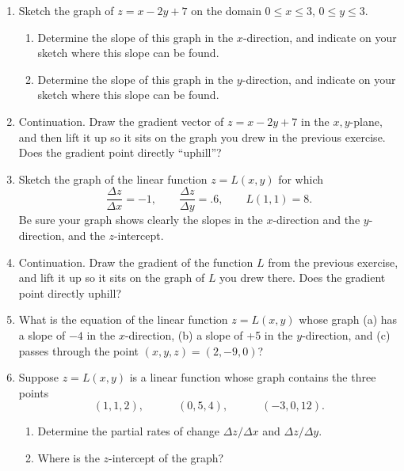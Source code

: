 \begin{enumerate}
\begin{enumerate}
  \item Write the formula for $z$ in intercept form.


\end{enumerate}
\item Sketch the graph of $z = x - 2y + 7$ on the domain $0 \leq x
\leq 3$, $0 \leq y \leq 3$.

  \begin{enumerate}
  \item Determine the slope of this graph in the $x$-direction, and
indicate on your sketch where this slope can be found.

  \item Determine the slope of this graph in the $y$-direction, and
indicate on your sketch where this slope can be found.


\end{enumerate}
\item Continuation.  Draw the gradient vector of $z = x - 2y + 7$ in
the $x, y$-plane, and then lift it up so it sits on the graph you drew
in the previous exercise.  Does the gradient point directly
``uphill''?


\item Sketch the graph of the linear function $z = L(x, y)$ for which
	\[
\dfrac{\Delta z}{\Delta x} = -1, \qquad \dfrac{\Delta z}{\Delta y} = .6,
		\qquad L(1, 1) = 8.
\]
Be sure your graph shows clearly the slopes in the $x$-direction and
the $y$-direction, and the $z$-intercept.


\item Continuation.  Draw the gradient of the function $L$ from the
previous exercise, and lift it up so it sits on the graph of $L$ you
drew there.  Does the gradient point directly uphill?


\item What is the equation of the linear function $z = L(x, y)$ whose
graph (a) has a slope of $-4$ in the $x$-direction, (b) a slope of +5
in the $y$-direction, and (c) passes through the point $(x, y, z) =
(2, -9, 0)$?


\item Suppose $z = L(x, y)$ is a linear function whose graph contains
the three points
	\[
(1, 1, 2), \qquad \quad (0, 5, 4), \qquad \quad (-3, 0, 12).
\]


  \begin{enumerate}
  \item Determine the partial rates of change $\Delta z/\Delta x$ and
$\Delta z/\Delta y$.

  \item Where is the $z$-intercept of the graph?


\end{enumerate}
\end{enumerate}
